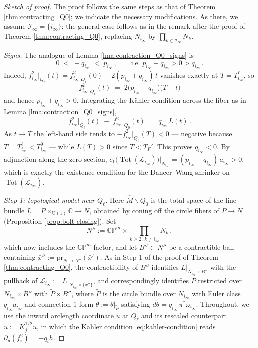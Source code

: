 \documentclass[11pt]{amsart}
\theoremstyle{plain}
\numberwithin{equation}{section}
\theoremstyle{definition}
\theoremstyle{remark}
\begin{document}
\begin{proof}[Sketch of proof]
The proof follows the same steps as that of Theorem \ref{thm:contracting_Q0}; we indicate the necessary modifications. As there, we assume $\mathcal{I}_\infty = \{i_\infty\}$; the general case follows as in the remark after the proof of Theorem \ref{thm:contracting_Q0}, replacing $N_{i_\infty}$ by $\prod_{k \in \mathcal{I}_\infty} N_k$.

\emph{Signs.} The analogue of Lemma \ref{lma:contraction_Q0_signs} is
\[0 \;<\; -q_{i_\infty} \;<\; p_{i_\infty}\,, \qquad \text{i.e. } p_{i_\infty} + q_{i_\infty} > 0 > q_{i_\infty}\,.\]
Indeed, $f_{i_\infty}^2\big|_{Q_\ell}(t) = f_{i_\infty}^2\big|_{Q_\ell}(0) - 2(p_{i_\infty} + q_{i_\infty})\,t$ vanishes exactly at $T = T_{i_\infty}^\ell$, so
\[f_{i_\infty}^2\big|_{Q_\ell}(t) \;=\; 2\big(p_{i_\infty} + q_{i_\infty}\big)\big(T-t\big)\]
and hence $p_{i_\infty} + q_{i_\infty} > 0$. Integrating the K\"ahler condition across the fiber as in Lemma \ref{lma:contraction_Q0_signs},
\[f_{i_\infty}^2 \big|_{Q_\ell} (t) \;-\; f_{i_\infty}^2 \big|_{Q_0} (t) \;=\; q_{i_\infty} \, L (t) \,.\]
As $t \to T$ the left-hand side tends to $-f_{i_\infty}^2\big|_{Q_0}(T) < 0$ --- negative because $T = T_{i_\infty}^\ell < T_{i_\infty}^0$ --- while $L(T) > 0$ since $T < T_F'$. This proves $q_{i_\infty} < 0$. By adjunction along the zero section, $c_1\big(\operatorname{Tot}(\mathcal{L}_{i_\infty})\big)\big|_{N_{i_\infty}} = (p_{i_\infty} + q_{i_\infty})\,a_{i_\infty} > 0$, which is exactly the existence condition for the Dancer--Wang shrinker on $\operatorname{Tot}(\mathcal{L}_{i_\infty})$.

\emph{Step 1: topological model near $Q_\ell$.} Here $\widehat{M} \backslash Q_0$ is the total space of the line bundle $L = P \times_{\mathrm{U}(1)} \mathbb{C} \to N$, obtained by coning off the circle fibers of $P \to N$ (Proposition \ref{prop:bolt-closing}). Set
\[N'' := \mathbb{CP}^m \times \prod_{k \geq 2, \, k \neq i_\infty} N_k\,,\]
which now includes the $\mathbb{CP}^m$-factor, and let $B'' \subset N''$ be a contractible ball containing $\bar{x}'' := \mathrm{pr}_{N \to N''}(\bar{x}')$. As in Step 1 of the proof of Theorem \ref{thm:contracting_Q0}, the contractibility of $B''$ identifies $L\big|_{N_{i_\infty} \times B''}$ with the pullback of $\mathcal{L}_{i_\infty} := L\big|_{N_{i_\infty} \times \{\bar{x}''\}}$, and correspondingly identifies $P$ restricted over $N_{i_\infty} \times B''$ with $\widetilde{P} \times B''$, where $\widetilde{P}$ is the circle bundle over $N_{i_\infty}$ with Euler class $q_{i_\infty} a_{i_\infty}$ and connection $1$-form $\widetilde{\theta} := \theta\big|_{\widetilde{P}}$ satisfying $d\widetilde{\theta} = q_{i_\infty}\,\pi^*\omega_{i_\infty}$. Throughout, we use the inward arclength coordinate $u$ at $Q_\ell$ and its rescaled counterpart $\hat{u} := K_j^{1/2}u$, in which the K\"ahler condition \eqref{eq:kahler-condition} reads $\partial_u (f_i^2) = -q_i h$.


\end{proof}
\end{document}
